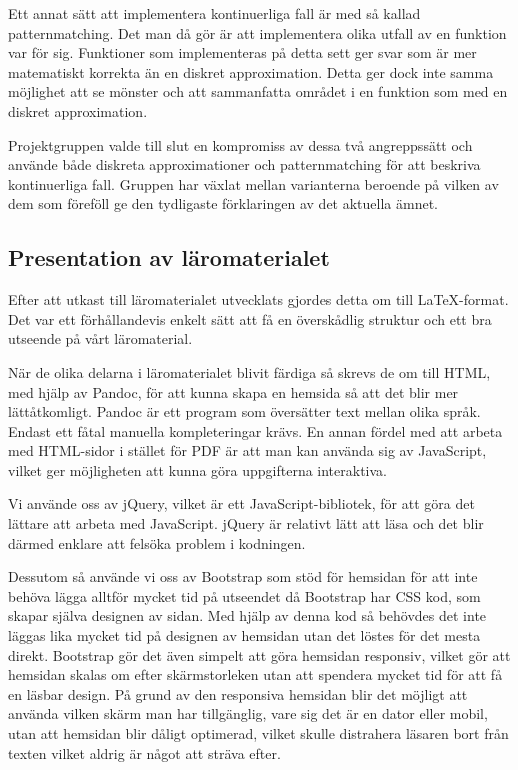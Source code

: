 \documentclass[12pt,a4paper,twoside,openright]{article}
\begin{document}
Ett annat sätt att implementera kontinuerliga fall är med så kallad
\gls{patternmatching}. Det man då gör är att implementera olika utfall
av en funktion var för sig. Funktioner som implementeras på detta sett
ger svar som är mer matematiskt korrekta än en diskret
approximation. Detta ger dock inte samma möjlighet att se mönster och
att sammanfatta området i en funktion som med en diskret
approximation.

Projektgruppen valde till slut en kompromiss av dessa två angreppssätt
och använde både diskreta approximationer och \gls{patternmatching}
för att beskriva kontinuerliga fall. Gruppen har växlat mellan
varianterna beroende på vilken av dem som föreföll ge den tydligaste
förklaringen av det aktuella ämnet. 

\subsection{Presentation av läromaterialet}
Efter att utkast till läromaterialet utvecklats gjordes detta om till
LaTeX-format. Det var ett förhållandevis enkelt sätt att få en överskådlig
struktur och ett bra utseende på vårt läromaterial.

När de olika delarna i läromaterialet blivit färdiga så skrevs de om
till HTML, med hjälp av Pandoc, för att kunna skapa en hemsida så att
det blir mer lätt\-åtkomligt. Pandoc är ett program som översätter
text mellan olika språk. Endast ett fåtal manuella kompleteringar
krävs.  En annan fördel med att arbeta med HTML-sidor i stället för
PDF är att man kan använda sig av JavaScript, vilket ger möjligheten
att kunna göra uppgifterna interaktiva.

Vi använde oss av jQuery, vilket är ett JavaScript-bibliotek, för att
göra det lättare att arbeta med JavaScript. jQuery är relativt lätt
att läsa och det blir därmed enklare att felsöka problem i kodningen.

Dessutom så använde vi oss av Bootstrap som stöd för hemsidan för att inte
behöva lägga alltför mycket tid på utseendet då Bootstrap har CSS kod,
som skapar själva designen av sidan. Med hjälp av denna kod så
behövdes det inte läggas lika mycket tid på designen av hemsidan utan det
löstes för det mesta direkt. Bootstrap gör det även simpelt att göra hemsidan
responsiv, vilket gör att hemsidan skalas om efter skärmstorleken utan att
spendera mycket tid för att få en läsbar design. På grund av den responsiva
hemsidan blir det möjligt att använda vilken skärm man har tillgänglig, vare
sig det är en dator eller mobil, utan att hemsidan blir dåligt optimerad,
vilket skulle distrahera läsaren bort från texten vilket aldrig är något att
sträva efter.
\end{document}
